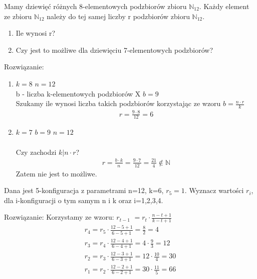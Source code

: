 \documentclass[12pt]{article}
\begin{document}
    \begin{exercise}
        Mamy dziewięć różnych 8-elementowych podzbiorów zbioru $\mathbb{N}_{12}$. Każdy element ze zbioru $\mathbb{N}_{12}$ należy do tej samej liczby r podzbiorów zbioru $\mathbb{N}_{12}$. 
        \begin{enumerate}
            \item Ile wynosi r?
            \item Czy jest to możliwe dla dziewięciu 7-elementowych podzbiorów?
        \end{enumerate}
    \end{exercise}
    Rozwiązanie:
    \begin{enumerate}
        \item $k = 8$ \quad $n = 12$\\
            b - liczba k-elementowych podzbiorów X
            $b = 9$ \\
            Szukamy ile wynosi liczba takich podzbiorów korzystając ze wzoru $b=\frac{n\cdot r}{k}$
            \begin{align*}
                r=\frac{9 \cdot 8}{12} = 6
            \end{align*}
        \item $k = 7$ \quad $b=9$ \quad $n=12$\\\\
            Czy zachodzi $k|n \cdot r$?
            \begin{align*}
                r=\frac{b \cdot k}{n} = \frac{9 \cdot 7}{12} = \frac{21}{4} \notin \mathbb{N}
            \end{align*}
            Zatem nie jest to możliwe.
    \end{enumerate}
    
    
    \begin{exercise}
        Dana jest 5-konfiguracja z parametrami n=12, k=6, $r_5=1$. Wyznacz wartości $r_i$, dla i-konfiguracji o tym samym n i k oraz i=1,2,3,4.
    \end{exercise}
    Rozwiązanie:
    Korzystamy ze wzoru: $r_{t-1}$ $= r_t \cdot \frac{n-t+1}{k-t+1}$
    \begin{align*}
        r_4 = r_5\cdot \frac{12-5+1}{6-5+1} = \frac{8}{2} = 4 \\
        r_3 = r_4\cdot \frac{12-4+1}{6-4+1} = 4 \cdot \frac{9}{3} = 12 \\
        r_2 = r_3\cdot \frac{12-3+1}{6-3+1} = 12 \cdot \frac{10}{4} = 30 \\
        r_1 = r_2\cdot \frac{12-2+1}{6-2+1} = 30 \cdot \frac{11}{5} = 66 \\
    \end{align*}
    
\end{document}
